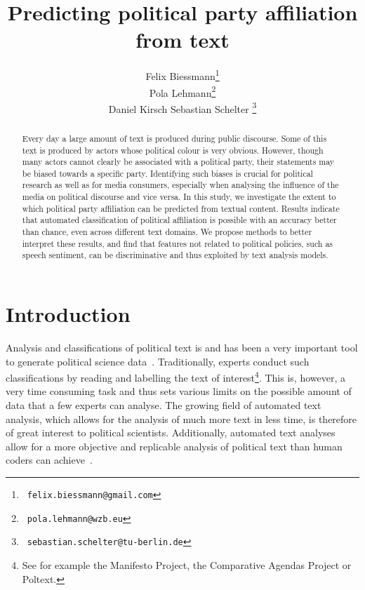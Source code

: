 \documentclass[11pt]{article}
\title{Predicting political party affiliation from text}
\author{Felix Biessmann\thanks{~\tt felix.biessmann@gmail.com}\\
    \And
 Pola Lehmann\thanks{ ~{\tt pola.lehmann@wzb.eu} }\\
\And 
Daniel Kirsch
 \And
  Sebastian Schelter \thanks{~\tt sebastian.schelter@tu-berlin.de}\\ 
}
\date{}
\begin{document}
\maketitle

\begin{abstract}
Every day a large amount of text is produced during public discourse. Some of this text is produced by actors whose political colour is very obvious. However, though many actors cannot clearly be associated with a political party, their statements may be biased towards a specific party. Identifying such biases is crucial for political research as well as for media consumers, especially when analysing the influence of the media on political discourse and vice versa. In this study, we investigate the extent to which political party affiliation can be predicted from textual content. Results indicate that automated classification of political affiliation is possible with an accuracy better than chance, even across different text domains. We propose methods to better interpret these results, and find that features not related to political policies, such as speech sentiment, can be discriminative and thus exploited by text analysis models.
\end{abstract}

\section{Introduction}
\label{sec:intro}
%
Analysis and classifications of political text is and has been a very important tool to generate political science data~\cite{Benoit.Forthcoming}. Traditionally, experts conduct such classifications by reading and labelling the text of interest\footnote{See for example the Manifesto Project, the Comparative Agendas Project or Poltext.}. This is, however, a very time consuming task and thus sets various limits on the possible amount of data that a few experts can analyse. The growing field of automated text analysis, which allows for the analysis of much more text in less time, is therefore of great interest to political scientists. Additionally, automated text analyses allow for a more objective and replicable analysis of political text than human coders can achieve~\cite{Benoit.2}.
\end{document}
